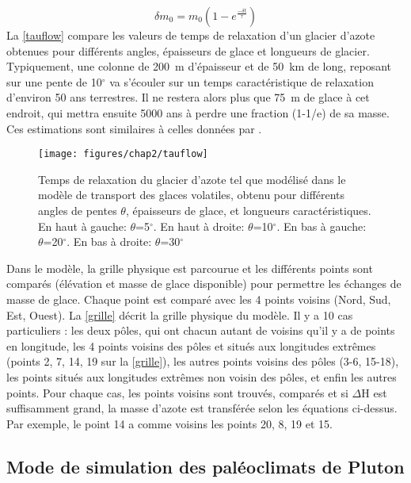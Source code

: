 \begin{equation}
\delta m_0=m_0 (1-e^{\frac{-\delta t}{\tau }})
\end{equation}
La \autoref{tauflow} compare les valeurs de temps de relaxation d'un glacier d'azote obtenues pour différents angles, épaisseurs de glace et longueurs de glacier. Typiquement, une colonne de 200~m d'épaisseur et de 50~km de long, reposant sur une pente de 10$^{\circ}$ va s’écouler sur un temps caractéristique de relaxation d’environ 50 ans terrestres. Il ne restera alors plus que 75~m de glace à cet endroit, qui mettra ensuite 5000 ans à perdre une fraction (1-1/e) de sa masse. Ces estimations sont similaires à celles données par \citet{Umur:17}.
\begin{figure}[!h]
\begin{center} 
	\texttt{[image: figures/chap2/tauflow]}
\end{center} 
\caption{Temps de relaxation du glacier d'azote tel que modélisé dans le modèle de transport des glaces volatiles, obtenu pour différents angles de pentes $\theta$, épaisseurs de glace, et longueurs caractéristiques. En haut à gauche: $\theta$=5$^{\circ}$. En haut à droite: $\theta$=10$^{\circ}$. En bas à gauche: $\theta$=20$^{\circ}$. En bas à droite: $\theta$=30$^{\circ}$} 
\label{tauflow}
\end{figure}

Dans le modèle, la grille physique est parcourue et les différents points sont comparés (élévation et masse de glace disponible) pour permettre les échanges de masse de glace. Chaque point est comparé avec les 4 points voisins (Nord, Sud, Est, Ouest). La \autoref{grille} décrit la grille physique du modèle. Il y a 10 cas particuliers : les deux pôles, qui ont chacun autant de voisins qu’il y a de points en longitude, les 4 points voisins des pôles et situés aux longitudes extrêmes (points 2, 7, 14, 19 sur la \autoref{grille}), les autres points voisins des pôles (3-6, 15-18), les points situés aux longitudes extrêmes non voisin des pôles, et enfin les autres points. Pour chaque cas, les points voisins sont trouvés, comparés et si $\Delta$H est suffisamment grand, la masse d’azote est transférée selon les équations ci-dessus.
Par exemple, le point 14 a comme voisins les points 20, 8, 19 et 15.


\subsection{Mode de simulation des paléoclimats de Pluton}

